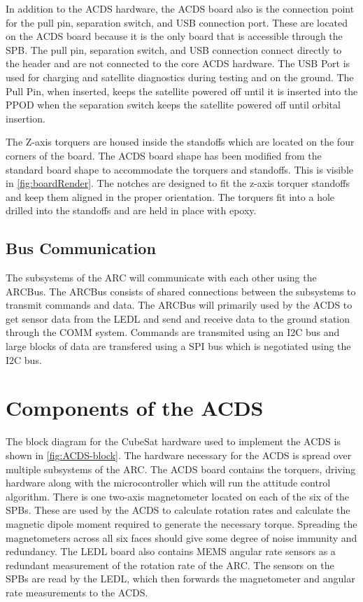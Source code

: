 In addition to the \ac{ACDS} hardware, the \ac{ACDS} board also is the connection point for the pull pin, separation switch, and \ac{USB} connection port. These are located on the \ac{ACDS} board because it is the only board that is accessible through the \ac{SPB}. The pull pin, separation switch, and \ac{USB} connection connect directly to the header and are not connected to the core \ac{ACDS} hardware. The \ac{USB} Port is used for charging and satellite diagnostics during testing and on the ground. The Pull Pin, when inserted, keeps the satellite powered off until it is inserted into the \ac{PPOD} when the separation switch keeps the satellite powered off until orbital insertion.

The Z-axis torquers are housed inside the standoffs which are located on the four corners of the board. The \ac{ACDS} board shape has been modified from the standard board shape to accommodate the torquers and standoffs. This is visible in \cref{fig:boardRender}. The notches are designed to fit the z-axis torquer standoffs and keep them aligned in the proper orientation. The torquers fit into a hole drilled into the standoffs and are held in place with epoxy. 

\subsection{Bus Communication}

The subsystems of the \ac{ARC} will communicate with each other using the ARCBus. The ARCBus consists of shared connections between the subsystems to transmit commands and data. The ARCBus will primarily used by the \ac{ACDS} to get sensor data from the \ac{LEDL} and send and receive data to the ground station through the COMM system. Commands are transmited using an \ac{I2C} bus and large blocks of data are transfered using a \ac{SPI} bus which is negotiated using the \ac{I2C} bus.

\section{Components of the \acl*{ACDS}}

The block diagram for the CubeSat hardware used to implement the \ac{ACDS} is shown in \cref{fig:ACDS-block}. The hardware necessary for the \ac{ACDS} is spread over multiple subsystems of the \ac{ARC}. The \ac{ACDS} board contains the torquers, driving hardware along with the microcontroller which will run the attitude control algorithm. There is one two-axis magnetometer located on each of the six of the \acp{SPB}. These are used by the \ac{ACDS} to calculate rotation rates and calculate the magnetic dipole moment required to generate the necessary torque. Spreading the magnetometers across all six faces should give some degree of noise immunity and redundancy. The \ac{LEDL} board also contains \ac{MEMS} angular rate sensors as a redundant measurement of the rotation rate of the \ac{ARC}. The sensors on the \acp{SPB} are read by the \ac{LEDL}, which then forwards the magnetometer and angular rate measurements to the \ac{ACDS}.

